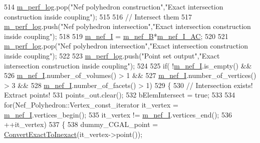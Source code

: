 \begin{DoxyCode}
514         \hyperlink{classcarl_1_1_intersection___tools_afe18e6ca5fd12bae08efb98f69c71a48}{m\_perf\_log}.pop(\textcolor{stringliteral}{"Nef polyhedron construction"},\textcolor{stringliteral}{"Exact intersection construction inside
       coupling"});
515 
516         \textcolor{comment}{// Intersect them}
517         \hyperlink{classcarl_1_1_intersection___tools_afe18e6ca5fd12bae08efb98f69c71a48}{m\_perf\_log}.push(\textcolor{stringliteral}{"Nef polyhedron intersection"},\textcolor{stringliteral}{"Exact intersection construction inside
       coupling"});
518 
519         \hyperlink{classcarl_1_1_intersection___tools_a47353dc1c374f45bf3dbaae667270cf3}{m\_nef\_I} = \hyperlink{classcarl_1_1_intersection___tools_a0b134a30452c8a767fc4265c7c0296a9}{m\_nef\_B}*\hyperlink{classcarl_1_1_intersection___tools_a8333f16787459e65c4fe913dad50b5c6}{m\_nef\_I\_AC};
520 
521         \hyperlink{classcarl_1_1_intersection___tools_afe18e6ca5fd12bae08efb98f69c71a48}{m\_perf\_log}.pop(\textcolor{stringliteral}{"Nef polyhedron intersection"},\textcolor{stringliteral}{"Exact intersection construction inside
       coupling"});
522 
523         \hyperlink{classcarl_1_1_intersection___tools_afe18e6ca5fd12bae08efb98f69c71a48}{m\_perf\_log}.push(\textcolor{stringliteral}{"Point set output"},\textcolor{stringliteral}{"Exact intersection construction inside coupling"});
524 
525         \textcolor{keywordflow}{if}(     !\hyperlink{classcarl_1_1_intersection___tools_a47353dc1c374f45bf3dbaae667270cf3}{m\_nef\_I}.is\_empty() &&
526                  \hyperlink{classcarl_1_1_intersection___tools_a47353dc1c374f45bf3dbaae667270cf3}{m\_nef\_I}.number\_of\_volumes() > 1 &&
527                  \hyperlink{classcarl_1_1_intersection___tools_a47353dc1c374f45bf3dbaae667270cf3}{m\_nef\_I}.number\_of\_vertices() > 3 &&
528                  \hyperlink{classcarl_1_1_intersection___tools_a47353dc1c374f45bf3dbaae667270cf3}{m\_nef\_I}.number\_of\_facets() > 1)
529         \{
530             \textcolor{comment}{// Intersection exists! Extract points!}
531             points\_out.clear();
532             bElemIntersect = \textcolor{keyword}{true};
533 
534             \textcolor{keywordflow}{for}(Nef\_Polyhedron::Vertex\_const\_iterator it\_vertex = \hyperlink{classcarl_1_1_intersection___tools_a47353dc1c374f45bf3dbaae667270cf3}{m\_nef\_I}.vertices\_begin();
535                     it\_vertex != \hyperlink{classcarl_1_1_intersection___tools_a47353dc1c374f45bf3dbaae667270cf3}{m\_nef\_I}.vertices\_end();
536                     ++it\_vertex)
537             \{
538                 dummy\_CGAL\_point = \hyperlink{classcarl_1_1_intersection___tools_a8cd632ee9314f5981c620af325245413}{ConvertExactToInexact}(it\_vertex->point());

\end{DoxyCode}
